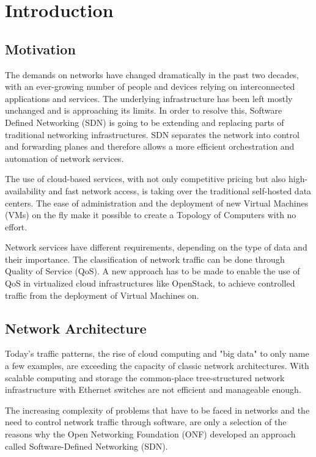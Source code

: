 \chapter{Introduction}
\label{chapter_introduction}



\section{Motivation}

The demands on networks have changed dramatically in the past two decades, with an ever-growing number of people and devices relying on interconnected applications and services. The underlying infrastructure has been left mostly unchanged and is approaching its limits. In order to resolve this, Software Defined Networking (SDN) is going to be extending and replacing parts of traditional networking infrastructures. SDN separates the network into control and forwarding planes and therefore allows a more efficient orchestration and automation of network services.

The use of cloud-based services, with not only competitive pricing but also high-availability and fast network access,  is taking over the traditional self-hosted data centers. The ease of administration and the deployment of new Virtual Machines (VMs) on the fly make it possible to create a Topology of Computers with no effort.

Network services have different requirements, depending on the type of data and their importance. The classification of network traffic can be done through Quality of Service (QoS). A new approach has to be made to enable the use of QoS in virtualized cloud infrastructures like OpenStack, to achieve controlled traffic from the deployment of Virtual Machines on.


\section{Network Architecture}
Today's traffic patterns, the rise of cloud computing and "big data" to only name a few examples, are exceeding the capacity of classic network architectures. With scalable computing and storage the common-place tree-structured network infrastructure with Ethernet switches are not efficient and manageable enough. 

The increasing complexity of problems that have to be faced in networks and the need to control network traffic through software, are only a selection of the reasons why the Open Networking Foundation (ONF) developed an approach called Software-Defined Networking (SDN).

